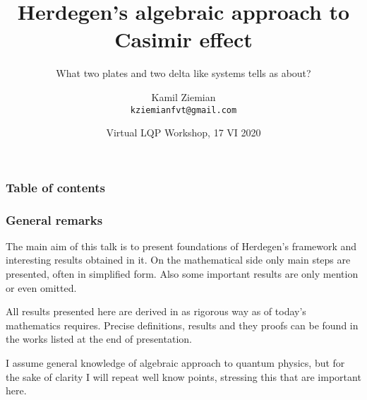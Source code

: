 \documentclass[10pt,t]{beamer}
\title{Herdegen's algebraic approach to Casimir effect}
\subtitle{What two plates and two delta like systems tells as about?}
\author{Kamil Ziemian \\
  \texttt{kziemianfvt@gmail.com}}
\institute{Jagiellonian University in~Cracow}
\date[17 June 2020]{Virtual LQP Workshop, 17 VI 2020}
\begin{document}






\RaggedRight





\maketitle %





\begin{frame}
  \frametitle{Table of contents}


  \tableofcontents %

\end{frame}










\begin{frame}
  \frametitle{General remarks}


  The main aim of this talk is to present foundations of Herdegen's
  framework and interesting results obtained in it. On the
  mathematical side only main steps are presented, often in simplified
  form. Also some important results are only mention or even omitted.

  All results presented here are derived in as rigorous way as of
  today's mathematics requires. Precise definitions, results and they
  proofs can be found in the works listed at the end of presentation.

  I assume general knowledge of algebraic approach to quantum physics,
  but for the sake of clarity I will repeat well know points,
  stressing this that are important here.

\end{frame}










\end{document}
